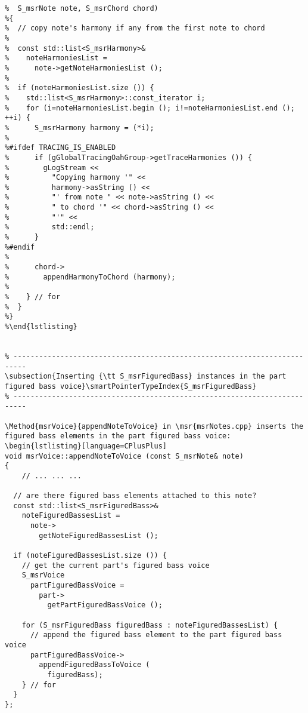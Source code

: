 %
\begin{lstlisting}[language=CPlusPlus]
%void mxsr2msrTranslator::copyNoteHarmoniesToChord (
%  S_msrNote note, S_msrChord chord)
%{
%  // copy note's harmony if any from the first note to chord
%
%  const std::list<S_msrHarmony>&
%    noteHarmoniesList =
%      note->getNoteHarmoniesList ();
%
%  if (noteHarmoniesList.size ()) {
%    std::list<S_msrHarmony>::const_iterator i;
%    for (i=noteHarmoniesList.begin (); i!=noteHarmoniesList.end (); ++i) {
%      S_msrHarmony harmony = (*i);
%
%#ifdef TRACING_IS_ENABLED
%      if (gGlobalTracingOahGroup->getTraceHarmonies ()) {
%        gLogStream <<
%          "Copying harmony '" <<
%          harmony->asString () <<
%          "' from note " << note->asString () <<
%          " to chord '" << chord->asString () <<
%          "'" <<
%          std::endl;
%      }
%#endif
%
%      chord->
%        appendHarmonyToChord (harmony);
%
%    } // for
%  }
%}
%\end{lstlisting}


\subsection{Inserting {\tt S_msrFiguredBass} instances in the part figured bass voice}\smartPointerTypeIndex{S_msrFiguredBass}

\Method{msrVoice}{appendNoteToVoice} in \msr{msrNotes.cpp} inserts the figured bass elements in the part figured bass voice:
\begin{lstlisting}[language=CPlusPlus]
void msrVoice::appendNoteToVoice (const S_msrNote& note)
{
	// ... ... ...

  // are there figured bass elements attached to this note?
  const std::list<S_msrFiguredBass>&
    noteFiguredBassesList =
      note->
        getNoteFiguredBassesList ();

  if (noteFiguredBassesList.size ()) {
    // get the current part's figured bass voice
    S_msrVoice
      partFiguredBassVoice =
        part->
          getPartFiguredBassVoice ();

    for (S_msrFiguredBass figuredBass : noteFiguredBassesList) {
      // append the figured bass element to the part figured bass voice
      partFiguredBassVoice->
        appendFiguredBassToVoice (
          figuredBass);
    } // for
  }
};
\end{lstlisting}


